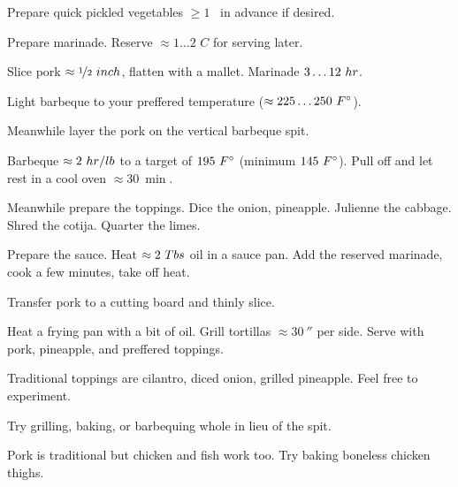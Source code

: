 \begin{preparation}
\item Prepare quick pickled vegetables $\ge 1$ \week~in advance if desired.

\item Prepare marinade.
	Reserve $\approx 1 \dots 2$ $C$ for serving later.

\item Slice pork $\approx \onehalf~\inch$, flatten with a mallet.
	Marinade $3 \dots 12~\hour$.

\item Light barbeque to your preffered temperature ($\approx 225 \dots 250~\Fahrenheit$).

\item Meanwhile layer the pork on the vertical barbeque spit.

\item Barbeque $\approx 2~\hour / \pound$ to a target of $195~\Fahrenheit$ (minimum $145~\Fahrenheit$).
	Pull off and let rest in a cool oven $\approx 30~\min$.

\item Meanwhile prepare the toppings.
	Dice the onion, pineapple.
	Julienne the cabbage.
	Shred the cotija.
	Quarter the limes.

\item Prepare the sauce.
	Heat $\approx 2~\Tablespoon$ oil in a sauce pan.
	Add the reserved marinade, cook a few minutes, take off heat.

\item Transfer pork to a cutting board and thinly slice.

\item Heat a frying pan with a bit of oil.
	Grill tortillas $\approx 30~\second$ per side.
	Serve with pork, pineapple, and preffered toppings.
\end{preparation}


\begin{variation}
\item Traditional toppings are cilantro, diced onion, grilled pineapple.
	Feel free to experiment.

\item Try grilling, baking, or barbequing whole in lieu of the spit.

\item Pork is traditional but chicken and fish work too.
	Try baking boneless chicken thighs.
\end{variation}


\recipeend
